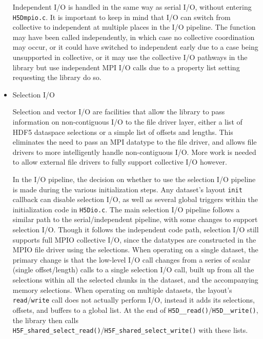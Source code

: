 \begin{itemize}
Independent I/O is handled in the same way as serial I/O, without entering \texttt{H5Dmpio.c}. It is important to keep in mind that I/O can switch from collective to independent at multiple places in the I/O pipeline. The function may have been called independently, in which case no collective coordination may occur, or it could have switched to independent early due to a case being unsupported in collective, or it may use the collective I/O pathways in the library but use independent MPI I/O calls due to a property list setting requesting the library do so.

    \item Selection I/O

Selection and vector I/O are facilities that allow the library to pass information on non-contiguous I/O to the file driver layer, either a list of HDF5 dataspace selections or a simple list of offsets and lengths. This eliminates the need to pass an MPI datatype to the file driver, and allows file drivers to more intelligently handle non-contiguous I/O. More work is needed to allow external file drivers to fully support collective I/O however.

In the I/O pipeline, the decision on whether to use the selection I/O pipeline is made during the various initialization steps. Any dataset's layout \texttt{init} callback can disable selection I/O, as well as several global triggers within the initialization code in \texttt{H5Dio.c}. The main selection I/O pipeline follows a similar path to the serial/independent pipeline, with some changes to support selection I/O. Though it follows the independent code path, selection I/O still supports full MPIO collective I/O, since the datatypes are constructed in the MPIO file driver using the selections. When operating on a single dataset, the primary change is that the low-level I/O call changes from a series of scalar (single offset/length) calls to a single selection I/O call, built up from all the selections within all the selected chunks in the dataset, and the accompanying memory selections. When operating on multiple datasets, the layout's \texttt{read}/\texttt{write} call does not actually perform I/O, instead it adds its selections, offsets, and buffers to a global list. At the end of \texttt{H5D\_\_read()}/\texttt{H5D\_\_write()}, the library then calls \\ \texttt{H5F\_shared\_select\_read()}/\texttt{H5F\_shared\_select\_write()} with these lists.


\end{itemize}
